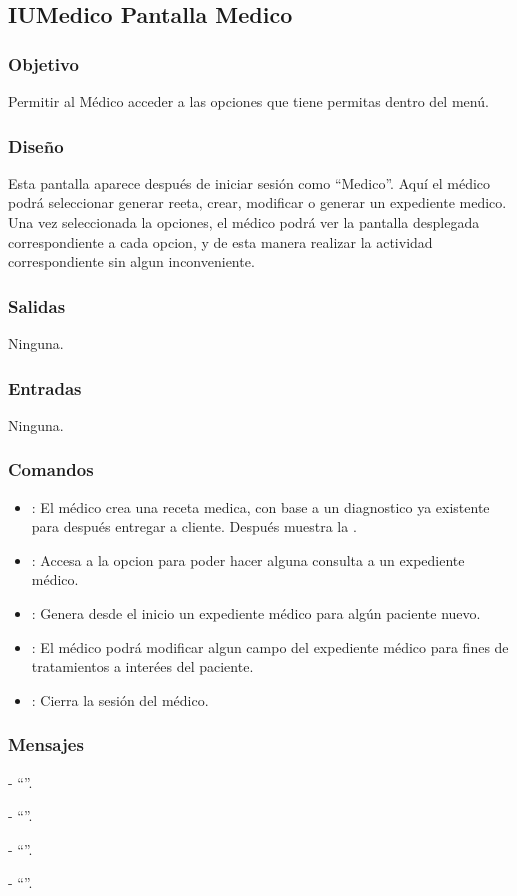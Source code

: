 \subsection{IUMedico Pantalla Medico}

\subsubsection{Objetivo}
	Permitir al M\'edico acceder a las opciones que tiene permitas dentro del men\'u.

\subsubsection{Diseño}
	Esta pantalla aparece despu\'es de iniciar sesi\'on como "`Medico"'. Aqu\'i el m\'edico podr\'a seleccionar generar reeta, crear, modificar o generar un expediente medico. Una vez seleccionada la opciones, el m\'edico podr\'a ver la pantalla desplegada correspondiente a cada opcion, y de esta manera realizar la actividad correspondiente sin algun inconveniente.


\subsubsection{Salidas}

	Ninguna.

\subsubsection{Entradas}
Ninguna.

\subsubsection{Comandos}
\begin{itemize}
		\item {}: El m\'edico crea una receta medica, con base a un diagnostico ya existente para despu\'es entregar a cliente. Despu\'es muestra la \label{IUConfirmar}.
		\item {}: Accesa a la opcion para poder hacer alguna consulta a un expediente m\'edico.
		\item {}: Genera desde el inicio un expediente m\'edico para alg\'un paciente nuevo.
		\item {}: El m\'edico podr\'a modificar algun campo del expediente m\'edico para fines de tratamientos a inter\'ees del paciente.
		\item {}: Cierra la sesi\'on del m\'edico.
\end{itemize}

\subsubsection{Mensajes}
	\begin{Citemize}
		\item {\bf } - "`"'.
		\item {\bf } - "`"'.
		\item {\bf } - "`"'.
		\item {\bf } - "`"'.
	\end{Citemize}